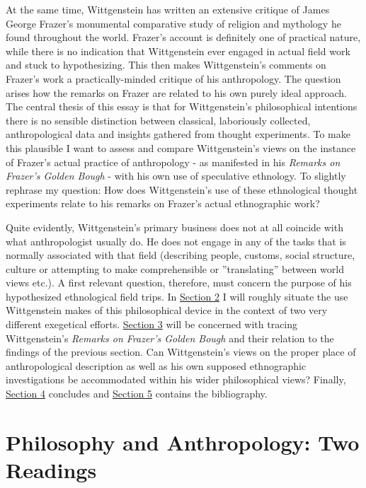 \documentclass{article}
\begin{document}
At the same time, Wittgenstein has written an extensive critique of James George Frazer's monumental comparative study of religion and mythology he found throughout the world. Frazer's account is definitely one of practical nature, while there is no indication that Wittgenstein ever engaged in actual field work and stuck to hypothesizing. This then makes Wittgenstein's comments on Frazer's work a practically-minded critique of his anthropology. The question arises how the remarks on Frazer are related to his own purely ideal approach. The central thesis of this essay is that for Wittgenstein's philosophical intentions there is no sensible distinction between classical, laboriously collected, anthropological data and insights gathered from thought experiments. To make this plausible I want to assess and compare Wittgenstein's views on the instance of Frazer's actual practice of anthropology - as manifested in his \textit{Remarks on Frazer's Golden Bough} - with his own use of speculative ethnology. To slightly rephrase my question: How does Wittgenstein’s use of these ethnological thought experiments relate to his remarks on Frazer’s actual ethnographic work?

Quite evidently, Wittgenstein's primary business does not at all coincide with what anthropologist usually do. He does not engage in any of the tasks that is normally associated with that field (describing people, customs, social structure, culture or attempting to make comprehensible or ''translating'' between world views etc.). A first relevant question, therefore, must concern the purpose of his hypothesized ethnological field trips. In \hyperlink{sec2}{Section 2} I will roughly situate the use Wittgenstein makes of this philosophical device in the context of two very different exegetical efforts.
\hyperlink{sec3}{Section 3} will be concerned with tracing Wittgenstein's \textit{Remarks on Frazer's Golden Bough} and their relation to the findings of the previous section. Can Wittgenstein’s views on the proper place of anthropological description as well as his own supposed ethnographic investigations be accommodated within his wider philosophical views? Finally, \hyperlink{sec4}{Section 4} concludes and \hyperlink{sec5}{Section 5} contains the bibliography.

\section{Philosophy and Anthropology: Two Readings} %
\end{document}
